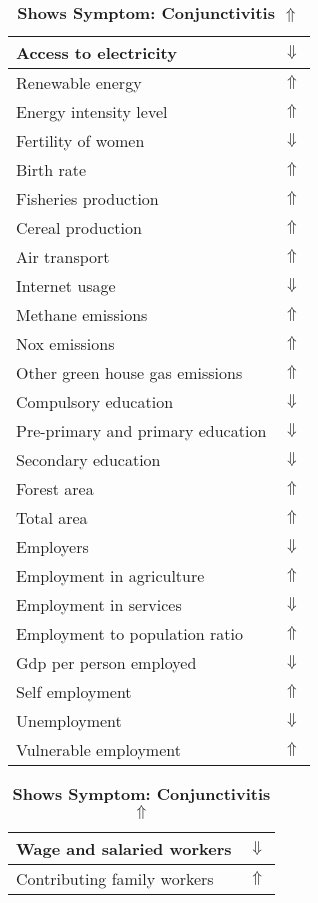 \documentclass[12pt,notitlepage,oneside]{report}
\begin{document}
\begin{table}[!htb]
\caption{\textbf{Shows Symptom: Conjunctivitis $\Uparrow$}}
\centering
\label{Correlated Socio-economic Factors0}
\begin{tabular}{|l|l|}
\hline
Access to electricity & $\Downarrow$\\ \hline
Renewable energy & $\Uparrow$\\ \hline
Energy intensity level & $\Uparrow$\\ \hline
Fertility of women & $\Downarrow$\\ \hline
Birth rate & $\Uparrow$\\ \hline
Fisheries production & $\Uparrow$\\ \hline
Cereal production & $\Uparrow$\\ \hline
Air transport  & $\Uparrow$\\ \hline
Internet usage & $\Downarrow$\\ \hline
Methane emissions & $\Uparrow$\\ \hline
Nox emissions & $\Uparrow$\\ \hline
Other green house gas emissions & $\Uparrow$\\ \hline
Compulsory education & $\Downarrow$\\ \hline
Pre-primary and primary education & $\Downarrow$\\ \hline
Secondary education & $\Downarrow$\\ \hline
Forest area & $\Uparrow$\\ \hline
Total area & $\Uparrow$\\ \hline
Employers & $\Downarrow$\\ \hline
Employment in agriculture & $\Uparrow$\\ \hline
Employment in services & $\Downarrow$\\ \hline
Employment to population ratio & $\Uparrow$\\ \hline
Gdp per person employed & $\Downarrow$\\ \hline
Self employment & $\Uparrow$\\ \hline
Unemployment & $\Downarrow$\\ \hline
Vulnerable employment & $\Uparrow$\\ \hline
\end{tabular}
\begin{tabular}{|l|l|}
\hline
Wage and salaried workers & $\Downarrow$\\ \hline
Contributing family workers & $\Uparrow$\\ \hline

\end{tabular}
\end{table}
\end{document}
